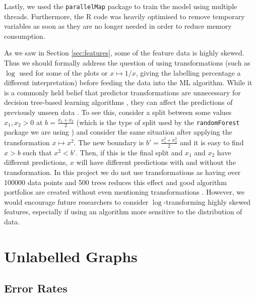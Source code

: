 \documentclass{l4proj}
\theoremstyle{definition}
\theoremstyle{remark}
\begin{document}
Lastly, we used the \texttt{parallelMap} package to train the model using
multiple threads. Furthermore, the R code was heavily optimised to remove
temporary variables as soon as they are no longer needed in order to reduce
memory consumption.

As we saw in Section \ref{sec:features}, some of the feature data is highly
skewed. Thus we should formally address the question of using transformations
(such as $\log$ used for some of the plots or $x \mapsto 1/x$, giving
the labelling percentage a different interpretation) before feeding the
data into the ML algorithm. While it is a commonly held belief that
predictor transformations are unnecessary for decision tree-based learning
algorithms \cite{DBLP:journals/classification/Friedman06,
  DBLP:books/lib/HastieTF09, cart}, they can affect the predictions of
previously unseen data \cite{DBLP:journals/corr/GaliliM16}. To see this,
consider a split between some values $x_1, x_2 > 0$ at $b =
\frac{x_1+x_2}{2}$ (which is the type of split used by the
\texttt{randomForest} package we are using
\cite{DBLP:journals/corr/GaliliM16}) and consider the same situation after
applying the transformation $x \mapsto x^2$. The new boundary is $b' =
\frac{x_1^2+x_2^2}{2}$ and it is easy to find $x > b$ such that $x^2 < b'$.
Then, if this is the final split and $x_1$ and $x_2$ have different predictions,
$x$ will have different predictions with and without the transformation. In
this project we do not use transformations as having over \num{100000} data
points and 500 trees reduces this effect and good algorithm portfolios are
created without even mentioning transformations
\cite{DBLP:conf/lion/KotthoffKHT15, DBLP:conf/lion/KotthoffMS16}. However, we
would encourage future researchers to consider $\log$-transforming highly skewed
features, especially if using an algorithm more sensitive to the distribution of
data.

\section{Unlabelled Graphs}

\subsection{Error Rates} \label{sec:unlabelled_error_rates}
\end{document}
